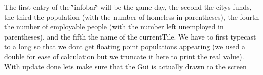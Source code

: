 \begin{DoxyCode}{0}
\DoxyCodeLine{}
\DoxyCodeLine{    \textcolor{comment}{/* Highlight entries of the right click context menu */}}
\DoxyCodeLine{}
\DoxyCodeLine{    \textcolor{keywordflow}{return};}
\DoxyCodeLine{\}}

\end{DoxyCode}


The first entry of the {\ttfamily \char`\"{}infobar\char`\"{}} will be the game day, the second the {\ttfamily city}\textquotesingle{}s funds, the third the population (with the number of homeless in parentheses), the fourth the number of employable people (with the number left unemployed in parentheses), and the fifth the name of the {\ttfamily current\+Tile}. We have to first typecast to a {\ttfamily long} so that we don\textquotesingle{}t get floating point populations appearing (we used a {\ttfamily double} for ease of calculation but we truncate it here to print the \textquotesingle{}real\textquotesingle{} value). With {\ttfamily update} done let\textquotesingle{}s make sure that the {\ttfamily \mbox{\hyperlink{classGui}{Gui}}} is actually drawn to the screen


